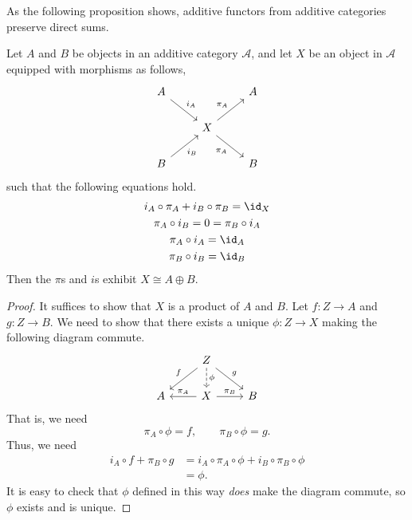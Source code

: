 \documentclass[main.tex]{subfiles}
\begin{document}
As the following proposition shows, additive functors from additive categories preserve direct sums.
\begin{lemma}
  \label{lemma:conditions_for_direct_sum}
  Let $A$ and $B$ be objects in an additive category $\mathcal{A}$, and let $X$ be an object in $\mathcal{A}$ equipped with morphisms as follows,
  \begin{equation*}
    \begin{tikzcd}
      A
      \arrow[dr, "i_{A}"]
      && A
      \\
      & X
      \arrow[ur, "\pi_{A}"]
      \arrow[dr, swap, "\pi_{A}"]
      \\
      B
      \arrow[ur, swap, "i_{B}"]
      && B
    \end{tikzcd}
  \end{equation*}
  such that the following equations hold.
  \begin{gather*}
    i_{A} \circ \pi_{A} + i_{B} \circ \pi_{B} = \id_{X} \\
    \pi_{A} \circ i_{B} = 0 = \pi_{B} \circ i_{A} \\
    \pi_{A} \circ i_{A} = \id_{A} \\
    \pi_{B} \circ i_{B} = \id_{B} \\
  \end{gather*}
  Then the $\pi$s and $i$s exhibit $X \cong A \oplus B$.
\end{lemma}
\begin{proof}
  It suffices to show that $X$ is a product of $A$ and $B$. Let $f\colon Z \to A$ and $g\colon Z \to B$. We need to show that there exists a unique $\phi\colon Z \to X$ making the following diagram commute.
  \begin{equation*}
    \begin{tikzcd}
      & Z
      \arrow[dl, swap, "f"]
      \arrow[d, dashed, "\phi"]
      \arrow[dr, "g"]
      \\
      A
      & X
      \arrow[l, swap, "\pi_{A}"]
      \arrow[r, "\pi_{B}"]
      & B
    \end{tikzcd}
  \end{equation*}
  That is, we need
  \begin{equation*}
    \pi_{A} \circ \phi = f,\qquad \pi_{B} \circ \phi = g.
  \end{equation*}
  Thus, we need
  \begin{align*}
    i_{A} \circ f + \pi_{B} \circ g  &= i_{A} \circ \pi_{A} \circ \phi + i_{B} \circ \pi_{B} \circ \phi \\
    &= \phi.
  \end{align*}
  It is easy to check that $\phi$ defined in this way \emph{does} make the diagram commute, so $\phi$ exists and is unique.
\end{proof}
\end{document}
